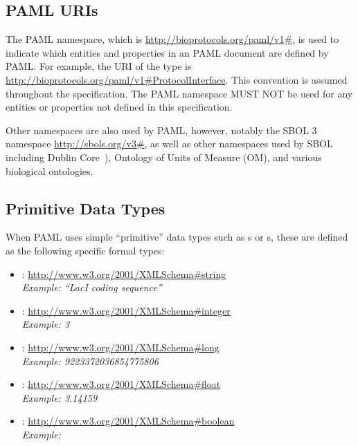\subsection{PAML URIs}
 \label{sec:pamlURIs}
  
The PAML namespace, which is \url{http://bioprotocols.org/paml/v1\#}, is used to indicate which entities and properties in an PAML document are defined by PAML. 
For example, the URI of the type  is \url{http://bioprotocols.org/paml/v1\#ProtocolInterface}. 
This convention is assumed throughout the specification.
The PAML namespace MUST NOT be used for any entities or properties not defined in this specification.  

Other namespaces are also used by PAML, however, notably the SBOL 3 namespace \url{http://sbols.org/v3\#}, as well as other namespaces used by SBOL including Dublin Core~\citep{dcmi2012}), Ontology of Units of Measure (OM), and various biological ontologies.


\subsection{Primitive Data Types}
\label{sec:datatypes}
\label{sec:string}
\label{sec:integer}
\label{sec:long}
\label{sec:float}
\label{sec:boolean}
\label{sec:URI}
\label{sec:literal}

When PAML uses simple ``primitive'' data types such as s or s, these are defined as the following specific formal types:
\begin{itemize}
\item {}: \url{http://www.w3.org/2001/XMLSchema\#string}\\
  {\em Example: ``LacI coding sequence''}
\item {}: \url{http://www.w3.org/2001/XMLSchema\#integer}\\
  {\em Example: 3}
\item {}: \url{http://www.w3.org/2001/XMLSchema\#long}\\
  {\em Example: 9223372036854775806}
\item {}: \url{http://www.w3.org/2001/XMLSchema\#float}\\
  {\em Example: 3.14159}
\item {}: \url{http://www.w3.org/2001/XMLSchema\#boolean}\\
  {\em Example: }
\end{itemize}

